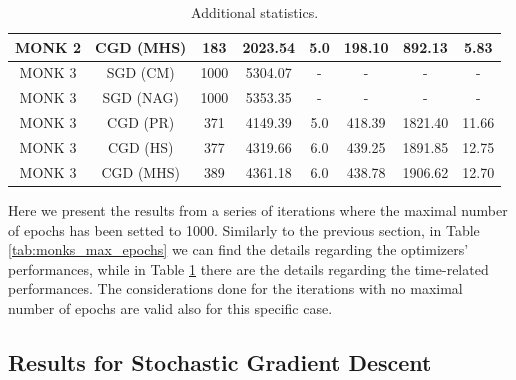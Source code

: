 \begin{table}[H]
\begin{subtable}{\textwidth}
{\begin{tabular}{| c | c | c | c | c | c | c | c |}
                            \hline
                            MONK 2 &  CGD (MHS) &               183 &       2023.54 &            5.0 &   198.10 &   892.13 &      5.83 \\
                            \hline
                            \hline
                            MONK 3 &   SGD (CM) &              1000 &       5304.07 &              - &        - &        - &         - \\
                            \hline
                            MONK 3 &  SGD (NAG) &              1000 &       5353.35 &              - &        - &        - &         - \\
                            \hline
                            \rowcolor[gray]{.9}
                            MONK 3 &   CGD (PR) &               371 &       4149.39 &            5.0 &   418.39 &  1821.40 &     11.66 \\
                            \hline
                            MONK 3 &   CGD (HS) &               377 &       4319.66 &            6.0 &   439.25 &  1891.85 &     12.75 \\
                            \hline
                            MONK 3 &  CGD (MHS) &               389 &       4361.18 &            6.0 &   438.78 &  1906.62 &     12.70 \\
                            \hline
                        \end{tabular}
                    }
                \end{subtable}
                \caption{Additional statistics.}
                \label{tab:monks_additional_max_epochs}
            \end{table}

            Here we present the results from a series of iterations where the maximal number of epochs has
            been setted to 1000. Similarly to the previous section, in Table \ref{tab:monks_max_epochs} we
            can find the details regarding the optimizers' performances, while in Table
            \ref{tab:monks_additional_max_epochs} there are the details regarding the time-related
            performances. The considerations done for the iterations with no maximal number of epochs are
            valid also for this specific case.


        \subsection{Results for Stochastic Gradient Descent} %
        \label{sub:results_for_stochastic_gradient_descent}

